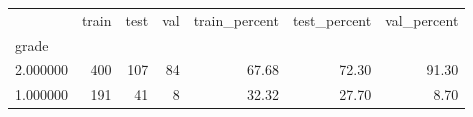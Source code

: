 \begin{tabular}{lrrrrrr}
\toprule
 & train & test & val & train_percent & test_percent & val_percent \\
grade &  &  &  &  &  &  \\
\midrule
2.000000 & 400 & 107 & 84 & 67.68 & 72.30 & 91.30 \\
1.000000 & 191 & 41 & 8 & 32.32 & 27.70 & 8.70 \\
\bottomrule
\end{tabular}
